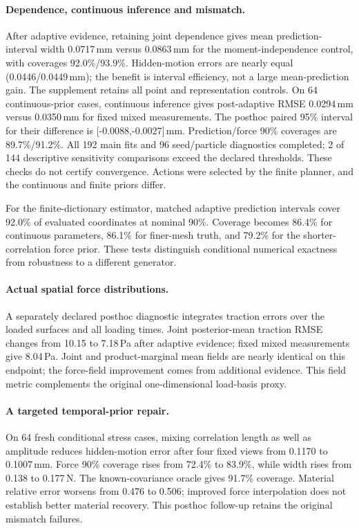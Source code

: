 \paragraph{Dependence, continuous inference and mismatch.}
After adaptive evidence, retaining joint dependence gives mean prediction-interval width 0.0717\,mm versus 0.0863\,mm for the moment-independence control, with coverages 92.0\%/93.9\%. Hidden-motion errors are nearly equal (0.0446/0.0449\,mm); the benefit is interval efficiency, not a large mean-prediction gain. The supplement retains all point and representation controls. On 64 continuous-prior cases, continuous inference gives post-adaptive RMSE 0.0294\,mm versus 0.0350\,mm for fixed mixed measurements. The posthoc paired 95\% interval for their difference is [-0.0088,-0.0027]\,mm. Prediction/force 90\% coverages are 89.7\%/91.2\%. All 192 main fits and 96 seed/particle diagnostics completed; 2 of 144 descriptive sensitivity comparisons exceed the declared thresholds. These checks do not certify convergence. Actions were selected by the finite planner, and the continuous and finite priors differ.

For the finite-dictionary estimator, matched adaptive prediction intervals cover 92.0\% of evaluated coordinates at nominal 90\%. Coverage becomes 86.4\% for continuous parameters, 86.1\% for finer-mesh truth, and 79.2\% for the shorter-correlation force prior. These tests distinguish conditional numerical exactness from robustness to a different generator.

\paragraph{Actual spatial force distributions.}
A separately declared posthoc diagnostic integrates traction errors over the loaded surfaces and all loading times. Joint posterior-mean traction RMSE changes from 10.15 to 7.18\,Pa after adaptive evidence; fixed mixed measurements give 8.04\,Pa. Joint and product-marginal mean fields are nearly identical on this endpoint; the force-field improvement comes from additional evidence. This field metric complements the original one-dimensional load-basis proxy.

\paragraph{A targeted temporal-prior repair.}
On 64 fresh conditional stress cases, mixing correlation length as well as amplitude reduces hidden-motion error after four fixed views from 0.1170 to 0.1007\,mm. Force 90\% coverage rises from 72.4\% to 83.9\%, while width rises from 0.138 to 0.177\,N. The known-covariance oracle gives 91.7\% coverage. Material relative error worsens from 0.476 to 0.506; improved force interpolation does not establish better material recovery. This posthoc follow-up retains the original mismatch failures.

